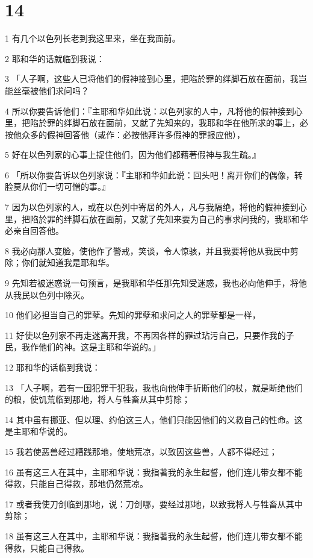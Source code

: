 \chapter{14}

\par 1 有几个以色列长老到我这里来，坐在我面前。
\par 2 耶和华的话就临到我说：
\par 3 「人子啊，这些人已将他们的假神接到心里，把陷於罪的绊脚石放在面前，我岂能丝毫被他们求问吗？
\par 4 所以你要告诉他们：『主耶和华如此说：以色列家的人中，凡将他的假神接到心里，把陷於罪的绊脚石放在面前，又就了先知来的，我耶和华在他所求的事上，必按他众多的假神回答他（或作：必按他拜许多假神的罪报应他），
\par 5 好在以色列家的心事上捉住他们，因为他们都藉著假神与我生疏。』
\par 6 「所以你要告诉以色列家说：『主耶和华如此说：回头吧！离开你们的偶像，转脸莫从你们一切可憎的事。』
\par 7 因为以色列家的人，或在以色列中寄居的外人，凡与我隔绝，将他的假神接到心里，把陷於罪的绊脚石放在面前，又就了先知来要为自己的事求问我的，我耶和华必亲自回答他。
\par 8 我必向那人变脸，使他作了警戒，笑谈，令人惊骇，并且我要将他从我民中剪除；你们就知道我是耶和华。
\par 9 先知若被迷惑说一句预言，是我耶和华任那先知受迷惑，我也必向他伸手，将他从我民以色列中除灭。
\par 10 他们必担当自己的罪孽。先知的罪孽和求问之人的罪孽都是一样，
\par 11 好使以色列家不再走迷离开我，不再因各样的罪过玷污自己，只要作我的子民，我作他们的神。这是主耶和华说的。」
\par 12 耶和华的话临到我说：
\par 13 「人子啊，若有一国犯罪干犯我，我也向他伸手折断他们的杖，就是断绝他们的粮，使饥荒临到那地，将人与牲畜从其中剪除；
\par 14 其中虽有挪亚、但以理、约伯这三人，他们只能因他们的义救自己的性命。这是主耶和华说的。
\par 15 我若使恶兽经过糟践那地，使地荒凉，以致因这些兽，人都不得经过；
\par 16 虽有这三人在其中，主耶和华说：我指著我的永生起誓，他们连儿带女都不能得救，只能自己得救，那地仍然荒凉。
\par 17 或者我使刀剑临到那地，说：刀剑哪，要经过那地，以致我将人与牲畜从其中剪除；
\par 18 虽有这三人在其中，主耶和华说：我指著我的永生起誓，他们连儿带女都不能得救，只能自己得救。
